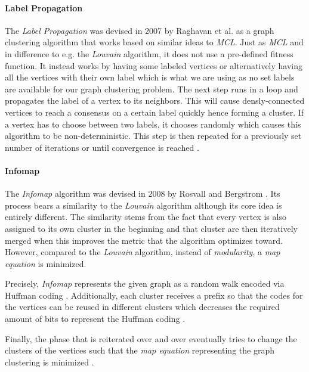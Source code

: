 \documentclass[12pt,a4paper]{report}
\begin{document}
\paragraph{Label Propagation \cite{raghavan2007lpa}}
The \textit{Label Propagation} was devised in 2007 by Raghavan et al.
as a graph clustering algorithm that works based on similar ideas to \textit{MCL}.
Just as \textit{MCL} and in difference to e.g. the \textit{Louvain} algorithm,
it does not use a pre\hyp defined fitness function.
It instead works by having some labeled vertices or alternatively having
all the vertices with their own label which is what we are using as no set labels
are available for our graph clustering problem.
The next step runs in a loop and propagates the label of a vertex to its neighbors.
This will cause densly\hyp connected vertices to reach a consensus on a certain label
quickly hence forming a cluster. If a vertex has to choose between two labels,
it chooses randomly which causes this algorithm to be non\hyp deterministic.
This step is then repeated for a previously set number of iterations or until
convergence is reached \cite{raghavan2007lpa}.

\paragraph{Infomap \cite{rosvall2008infomap}}
The \textit{Infomap} algorithm was devised in 2008 by Rosvall and Bergstrom
\cite{rosvall2008infomap}.
Its process bears a similarity to the \textit{Louvain} algorithm although
its core idea is entirely different. The similarity stems from the fact
that every vertex is also assigned to its own cluster in the beginning and
that cluster are then iteratively merged when this improves the metric that
the algorithm optimizes toward. However, compared to the \textit{Louvain}
algorithm, instead of \textit{modularity}, a \textit{map equation} is minimized.

Precisely, \textit{Infomap} represents the given graph as a random walk encoded
via Huffman coding \cite{huffman1952coding}.
Additionally, each cluster receives a prefix so that the codes for the vertices
can be reused in different clusters which decreases the required amount of bits
to represent the Huffman coding \cite{rosvall2008infomap}.

Finally, the phase that is reiterated over and over eventually tries to
change the clusters of the vertices such that the \textit{map equation}
representing the graph clustering is minimized \cite{rosvall2008infomap}.
\end{document}
